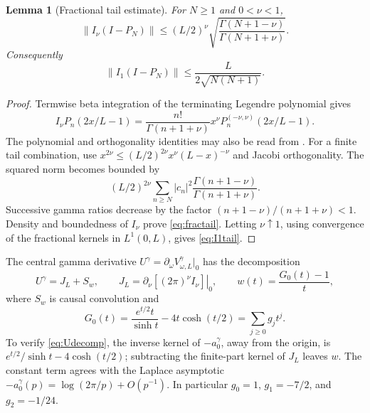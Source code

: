 \documentclass[11pt]{article}
\numberwithin{equation}{section}
\newtheorem{lemma}[theorem]{Lemma}
\theoremstyle{definition}
\theoremstyle{remark}
\newcommand{\norm}[1]{\lVert#1\rVert}
\begin{document}
\begin{lemma}[Fractional tail estimate]\label{lem:fractional}
For $N\ge1$ and $0<\nu<1$,
\begin{equation}\label{eq:fractail}
 \norm{I_\nu(I-P_N)}\le
 (L/2)^\nu\sqrt{\frac{\Gamma(N+1-\nu)}{\Gamma(N+1+\nu)}}.
\end{equation}
Consequently
\begin{equation}\label{eq:I1tail}
 \norm{I_1(I-P_N)}\le\frac{L}{2\sqrt{N(N+1)}}.
\end{equation}
\end{lemma}
\begin{proof}
Termwise beta integration of the terminating Legendre polynomial gives
\[
 I_\nu P_n(2x/L-1)=
 \frac{n!}{\Gamma(n+1+\nu)}x^\nu
 P_n^{(-\nu,\nu)}(2x/L-1).
\]
The polynomial and orthogonality identities may also be read from
\cite[\S\S18.3,18.5,18.17]{DLMF}. For a finite tail combination, use
$x^{2\nu}\le(L/2)^{2\nu}x^\nu(L-x)^{-\nu}$ and Jacobi orthogonality.
The squared norm becomes bounded by
\[
 (L/2)^{2\nu}\sum_{n\ge N}|c_n|^2
 \frac{\Gamma(n+1-\nu)}{\Gamma(n+1+\nu)}.
\]
Successive gamma ratios decrease by the factor
$(n+1-\nu)/(n+1+\nu)<1$. Density and boundedness of $I_\nu$ prove
\eqref{eq:fractail}. Letting $\nu\uparrow1$, using convergence of the
fractional kernels in $L^1(0,L)$, gives \eqref{eq:I1tail}.
\end{proof}

The central gamma derivative $U^\gamma=\partial_\omega V^\gamma_{\omega,L}|_0$
has the decomposition
\begin{equation}\label{eq:Udecomp}
 U^\gamma=J_L+S_w,\qquad
 J_L=\left.\partial_\nu[(2\pi)^\nu I_\nu]\right|_0,
 \qquad w(t)=\frac{G_0(t)-1}{t},
\end{equation}
where $S_w$ is causal convolution and
\begin{equation}\label{eq:G0}
 G_0(t)=\frac{e^{t/2}t}{\sinh t}-4t\cosh(t/2)
 =\sum_{j\ge0}g_jt^j.
\end{equation}
To verify \eqref{eq:Udecomp}, the inverse kernel of $-a^\gamma_0$, away
from the origin, is
$e^{t/2}/\sinh t-4\cosh(t/2)$; subtracting the finite-part kernel of
$J_L$ leaves $w$. The constant term agrees with the Laplace asymptotic
$-a^\gamma_0(p)=\log(2\pi/p)+O(p^{-1})$.
In particular $g_0=1$, $g_1=-7/2$, and $g_2=-1/24$.
\end{document}

